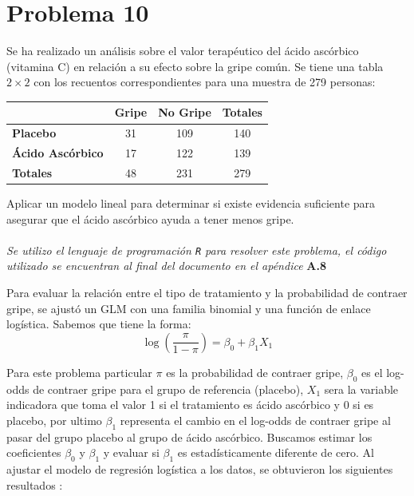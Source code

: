 \section*{Problema \textcolor{CIMATRed}{10}}

Se ha realizado un análisis sobre el valor terapéutico del ácido ascórbico (vitamina C) en relación a su efecto sobre la gripe común. Se tiene una tabla $2 \times 2$ con los recuentos correspondientes para una muestra de 279 personas:

\begin{center}
\begin{tabular}{l ccc}
\toprule
& \textbf{Gripe} & \textbf{No Gripe} & \textbf{Totales} \\
\midrule
\textbf{Placebo} & 31 & 109 & 140 \\
\textbf{Ácido Ascórbico} & 17 & 122 & 139 \\
\midrule
\textbf{Totales} & 48 & 231 & 279 \\
\bottomrule
\end{tabular}
\end{center}

Aplicar un modelo lineal para determinar si existe evidencia suficiente para asegurar que el ácido ascórbico ayuda a tener menos gripe.\\

\noindent{}\\

\textit{Se utilizo el lenguaje de programación \texttt{R} para resolver este problema, el código utilizado se encuentran al final del documento en el apéndice} \textbf{A.8}

Para evaluar la relación entre el tipo de tratamiento y la probabilidad de contraer gripe, se ajustó un GLM con una familia binomial y una función de enlace logística. Sabemos que tiene la forma:
\begin{equation}
    \log\left(\frac{\pi}{1-\pi}\right) = \beta_0 + \beta_1 X_1
\end{equation}

Para este problema particular $\pi$ es la probabilidad de contraer gripe, $\beta_0$ es el log-odds de contraer gripe para el grupo de referencia (placebo), $X_1$ sera la variable indicadora que toma el valor 1 si el tratamiento es ácido ascórbico y 0 si es placebo, por ultimo $\beta_1$ representa el cambio en el log-odds de contraer gripe al pasar del grupo placebo al grupo de ácido ascórbico. Buscamos estimar los coeficientes $\beta_0$ y $\beta_1$ y evaluar si $\beta_1$ es estadísticamente diferente de cero. Al ajustar el modelo de regresión logística a los datos, se obtuvieron los siguientes resultados :

